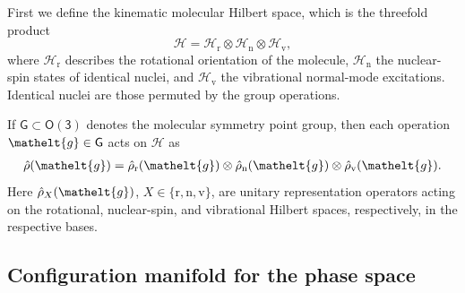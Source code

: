 \documentclass[
  reprint,
  aps,
  prx,
  superscriptaddress,
  amsmath,
  amssymb,
  longbibliography
]{revtex4-2}
\newcommand{\eltfont}[1]{{\let\sigma\eltsigma\mathelt{#1}}}
\newcommand{\grp}[1]{\mathsf{#1}}
\newcommand{\elt}[1]{\eltfont{#1}}
\newcommand{\gel}{\elt{g}}             %
\providecommand{\Othree}{\grp{O(3)}}
\begin{document}
First we define the kinematic molecular Hilbert space, which is the threefold product
\begin{equation}
\mathcal H
=
\mathcal H_{\mathrm r}
\otimes
\mathcal H_{\mathrm n}
\otimes
\mathcal H_{\mathrm v},
\label{eq:active_hilbert}
\end{equation}
where $\mathcal H_{\mathrm r}$ describes the rotational orientation of the molecule, $\mathcal H_{\mathrm n}$ the nuclear-spin states of identical nuclei, and $\mathcal H_{\mathrm v}$ the vibrational normal-mode excitations. Identical nuclei are those permuted by the group operations. 

If $\grp{G}\subset\Othree$ denotes the molecular symmetry point group, then each operation $\gel\in\grp{G}$ acts on $\mathcal H$ as 
\begin{align}
\hat{\rho}(\gel)
=
\hat{\rho}_{\mathrm{r}}(\gel)
\otimes
\hat{\rho}_{\mathrm{n}}(\gel)
\otimes
\hat{\rho}_{\mathrm{v}}(\gel).
\label{eq:total_group_action}
\end{align}
Here $\hat\rho_X(\gel)$, $X\in\{\mathrm r,\mathrm n,\mathrm v\}$, are unitary representation operators acting on the rotational, nuclear-spin, and vibrational Hilbert spaces, respectively, in the respective bases.


\subsection{Configuration manifold for the phase space}
\end{document}

